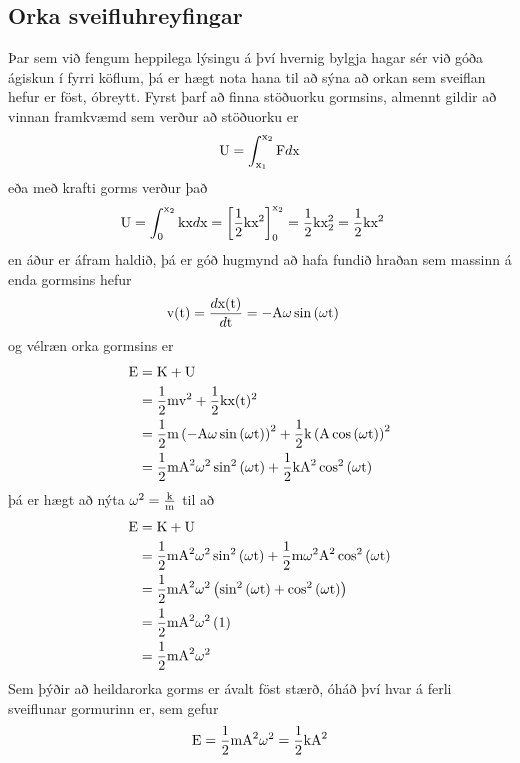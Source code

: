 \subsection{Orka sveifluhreyfingar}
Þar sem við fengum heppilega lýsingu á því hvernig bylgja hagar sér við góða
ágiskun í fyrri köflum, þá er hægt nota hana til að sýna að orkan sem sveiflan
hefur er föst, óbreytt. Fyrst þarf að finna stöðuorku gormsins, almennt gildir að
vinnan framkvæmd sem verður að stöðuorku er
\[
	\textrm{U} = \int_{\textrm{x}_1}^{\textrm{x}_2} \textrm{F} d \textrm{x}
\]
eða með krafti gorms verður það
\begin{align*}
	\textrm{U} &= \int_{0}^{\textrm{x}_2} \text{k} \textrm{x} d \textrm{x}
		= \left[ \frac{1}{2} \text{k} \textrm{x}^2 \right]_{0}^{\textrm{x}_2}
		= \frac{1}{2} \text{k} \textrm{x}_2^2
		= \frac{1}{2} \text{k} \textrm{x}^2
\end{align*}
en áður er áfram haldið, þá er góð hugmynd að hafa fundið hraðan sem massinn
á enda gormsins hefur
\begin{align*}
	\textrm{v}(\textrm{t}) &=  \frac{d \textrm{x}(\textrm{t})}{d \textrm{t}}
	= -\text{A} \omega \sin{(\omega\textrm{t})}
\end{align*}
og vélræn orka gormsins er
\begin{align*}
	\textrm{E} &= \textrm{K} + \textrm{U} \\
		&= \frac{1}{2} \textrm{m} \textrm{v}^2 + \frac{1}{2} \text{k} \textrm{x}(\textrm{t})^2 \\
		&= \frac{1}{2} \textrm{m} \left(-\text{A} \omega \sin{(\omega\textrm{t})} \right)^2
			+ \frac{1}{2} \text{k} \left( \text{A} \cos{(\omega\textrm{t})} \right)^2 \\
		&= \frac{1}{2} \textrm{m} \text{A}^2 \omega^2 \sin^2{(\omega \textrm{t})}
			+ \frac{1}{2} \text{k} \text{A}^2 \cos^2{(\omega \textrm{t})}
\end{align*}
þá er hægt að nýta $\omega^2 = \frac{\text{k}}{\textrm{m}}$ til að
\begin{align*}
	\textrm{E} &= \textrm{K} + \textrm{U} \\
		&= \frac{1}{2} \textrm{m} \text{A}^2 \omega^2 \sin^2{(\omega \textrm{t})}
			+ \frac{1}{2} \textrm{m} \omega^2 \text{A}^2 \cos^2{(\omega \textrm{t})} \\
		&= \frac{1}{2} \textrm{m} \text{A}^2 \omega^2 
			\left( \sin^2{(\omega \textrm{t})} + \cos^2{(\omega \textrm{t})} \right) \\
		&= \frac{1}{2} \textrm{m} \text{A}^2 \omega^2 
			\left( 1 \right) \\
		&= \frac{1}{2} \textrm{m} \text{A}^2 \omega^2
\end{align*}
Sem þýðir að heildarorka gorms er ávalt föst stærð, óháð því hvar á ferli sveiflunar
gormurinn er, sem gefur
\begin{equation} \label{eqn:wavemotion:springenergy}
	\textrm{E} = \frac{1}{2} \textrm{m} \text{A}^2 \omega^2
		= \frac{1}{2} \text{k} \text{A}^2
\end{equation}

